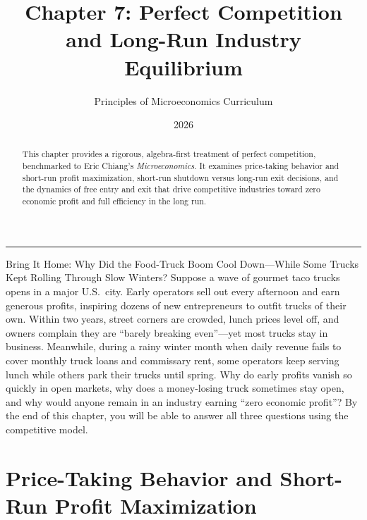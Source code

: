 \documentclass[11pt,letterpaper]{article}
\begin{document}
\title{\Huge\bfseries\color{SlateBlue} Chapter 7: Perfect Competition and Long-Run Industry Equilibrium}
\author{\large Principles of Microeconomics Curriculum}
\date{2026}
\maketitle

\thispagestyle{plain}

\begin{abstract}
This chapter provides a rigorous, algebra-first treatment of perfect competition, benchmarked to Eric Chiang's \emph{Microeconomics}. It examines price-taking behavior and short-run profit maximization, short-run shutdown versus long-run exit decisions, and the dynamics of free entry and exit that drive competitive industries toward zero economic profit and full efficiency in the long run.
\end{abstract}

\tableofcontents
\vspace{1.5em}
\hrule
\vspace{1.5em}

\begin{examplecase}{Bring It Home: Why Did the Food-Truck Boom Cool Down—While Some Trucks Kept Rolling Through Slow Winters?}
Suppose a wave of gourmet taco trucks opens in a major U.S.\ city. Early operators sell out every afternoon and earn generous profits, inspiring dozens of new entrepreneurs to outfit trucks of their own. Within two years, street corners are crowded, lunch prices level off, and owners complain they are ``barely breaking even''—yet most trucks stay in business. Meanwhile, during a rainy winter month when daily revenue fails to cover monthly truck loans and commissary rent, some operators keep serving lunch while others park their trucks until spring. Why do early profits vanish so quickly in open markets, why does a money-losing truck sometimes stay open, and why would anyone remain in an industry earning ``zero economic profit''? By the end of this chapter, you will be able to answer all three questions using the competitive model.
\end{examplecase}

\section{Price-Taking Behavior and Short-Run Profit Maximization}
\end{document}
